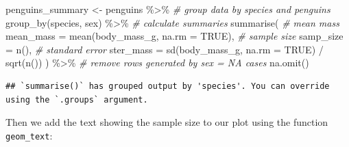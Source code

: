 \documentclass[
]{book}
\newenvironment{Shaded}{\begin{snugshade}}{\end{snugshade}}
\newcommand{\AttributeTok}[1]{\textcolor[rgb]{0.77,0.63,0.00}{#1}}
\newcommand{\CommentTok}[1]{\textcolor[rgb]{0.56,0.35,0.01}{\textit{#1}}}
\newcommand{\ConstantTok}[1]{\textcolor[rgb]{0.00,0.00,0.00}{#1}}
\newcommand{\FunctionTok}[1]{\textcolor[rgb]{0.00,0.00,0.00}{#1}}
\newcommand{\NormalTok}[1]{#1}
\newcommand{\OtherTok}[1]{\textcolor[rgb]{0.56,0.35,0.01}{#1}}
\newcommand{\SpecialCharTok}[1]{\textcolor[rgb]{0.00,0.00,0.00}{#1}}
\begin{document}
\begin{Shaded}
\begin{Highlighting}[]
\NormalTok{penguins\_summary }\OtherTok{\textless{}{-}}\NormalTok{ penguins }\SpecialCharTok{\%\textgreater{}\%} 
  \CommentTok{\# group data by species and penguins}
  \FunctionTok{group\_by}\NormalTok{(species, sex) }\SpecialCharTok{\%\textgreater{}\%} 
  \CommentTok{\# calculate summaries}
  \FunctionTok{summarise}\NormalTok{(}
    \CommentTok{\# mean mass}
    \AttributeTok{mean\_mass =} \FunctionTok{mean}\NormalTok{(body\_mass\_g, }\AttributeTok{na.rm =} \ConstantTok{TRUE}\NormalTok{),}
    \CommentTok{\# sample size}
    \AttributeTok{samp\_size =} \FunctionTok{n}\NormalTok{(),}
    \CommentTok{\# standard error}
    \AttributeTok{ster\_mass =} \FunctionTok{sd}\NormalTok{(body\_mass\_g, }\AttributeTok{na.rm =} \ConstantTok{TRUE}\NormalTok{) }\SpecialCharTok{/} \FunctionTok{sqrt}\NormalTok{(}\FunctionTok{n}\NormalTok{())}
\NormalTok{  ) }\SpecialCharTok{\%\textgreater{}\%} 
  \CommentTok{\# remove rows generated by sex = NA cases}
  \FunctionTok{na.omit}\NormalTok{()}
\end{Highlighting}
\end{Shaded}

\begin{verbatim}
## `summarise()` has grouped output by 'species'. You can override using the `.groups` argument.
\end{verbatim}

Then we add the text showing the sample size to our plot using the function \texttt{geom\_text}:
\end{document}
